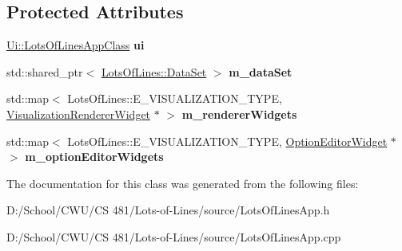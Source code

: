 \subsection*{Protected Attributes}
\begin{DoxyCompactItemize}
\item 
\hyperlink{class_ui_1_1_lots_of_lines_app_class}{Ui\+::\+Lots\+Of\+Lines\+App\+Class} {\bfseries ui}\hypertarget{class_lots_of_lines_app_a7dcf65cd508b6cf083f574a990695314}{}\label{class_lots_of_lines_app_a7dcf65cd508b6cf083f574a990695314}

\item 
std\+::shared\+\_\+ptr$<$ \hyperlink{class_lots_of_lines_1_1_data_set}{Lots\+Of\+Lines\+::\+Data\+Set} $>$ {\bfseries m\+\_\+data\+Set}\hypertarget{class_lots_of_lines_app_a58dc6cecfc94df878633f1622422b4cc}{}\label{class_lots_of_lines_app_a58dc6cecfc94df878633f1622422b4cc}

\item 
std\+::map$<$ Lots\+Of\+Lines\+::\+E\+\_\+\+V\+I\+S\+U\+A\+L\+I\+Z\+A\+T\+I\+O\+N\+\_\+\+T\+Y\+PE, \hyperlink{class_visualization_renderer_widget}{Visualization\+Renderer\+Widget} $\ast$ $>$ {\bfseries m\+\_\+renderer\+Widgets}\hypertarget{class_lots_of_lines_app_a311b80164ea07fb722dd51c4c93db430}{}\label{class_lots_of_lines_app_a311b80164ea07fb722dd51c4c93db430}

\item 
std\+::map$<$ Lots\+Of\+Lines\+::\+E\+\_\+\+V\+I\+S\+U\+A\+L\+I\+Z\+A\+T\+I\+O\+N\+\_\+\+T\+Y\+PE, \hyperlink{class_option_editor_widget}{Option\+Editor\+Widget} $\ast$ $>$ {\bfseries m\+\_\+option\+Editor\+Widgets}\hypertarget{class_lots_of_lines_app_a7df4df0a35a553e35baf49bb97e38e0a}{}\label{class_lots_of_lines_app_a7df4df0a35a553e35baf49bb97e38e0a}

\end{DoxyCompactItemize}


The documentation for this class was generated from the following files\+:\begin{DoxyCompactItemize}
\item 
D\+:/\+School/\+C\+W\+U/\+C\+S 481/\+Lots-\/of-\/\+Lines/source/Lots\+Of\+Lines\+App.\+h\item 
D\+:/\+School/\+C\+W\+U/\+C\+S 481/\+Lots-\/of-\/\+Lines/source/Lots\+Of\+Lines\+App.\+cpp\end{DoxyCompactItemize}
